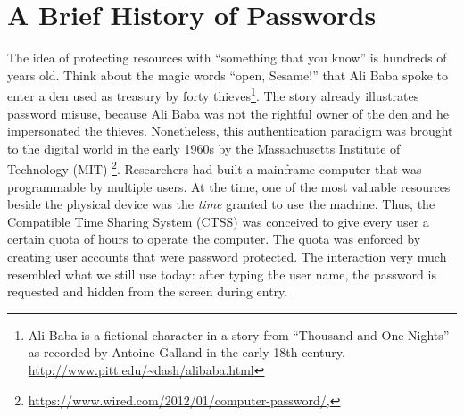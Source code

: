 \section{A Brief History of Passwords}
The idea of protecting resources with ``something that you know'' is hundreds of years old. Think about the magic words ``open, Sesame!'' that Ali Baba spoke to enter a den used as treasury by forty thieves\footnote{Ali Baba is a fictional character in a story from ``Thousand and One Nights'' as recorded by Antoine Galland in the early 18th century. \url{http://www.pitt.edu/~dash/alibaba.html} }. The story already illustrates password misuse, because Ali Baba was not the rightful owner of the den and he impersonated the thieves. Nonetheless, this authentication paradigm was brought to the digital world in the early 1960s by the Massachusetts Institute of Technology (MIT) \footnote{\url{https://www.wired.com/2012/01/computer-password/}, }. Researchers had built a mainframe computer that was programmable by multiple users. At the time, one of the most valuable resources beside the physical device was the \textit{time} granted to use the machine. Thus, the Compatible Time Sharing System (CTSS) was conceived to give every user a certain quota of hours to operate the computer. The quota was enforced by creating user accounts that were password protected. The interaction very much resembled what we still use today: after typing the user name, the password is requested and hidden from the screen during entry.


